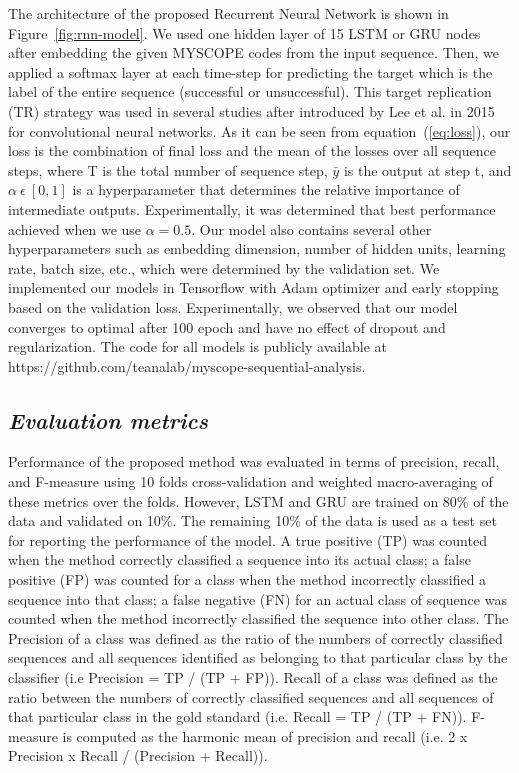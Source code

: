 \documentclass{amia_summit_2018}
\begin{document}
The architecture of the proposed Recurrent Neural Network is shown in Figure~\ref{fig:rnn-model}. We used one hidden layer of 15 LSTM or GRU nodes after embedding the given MYSCOPE codes from the input sequence. Then, we applied a softmax layer at each time-step for predicting the target which is the label of the entire sequence (successful or unsuccessful). This target replication (TR) strategy was used in several studies \cite{lipton2015learning, choi2016doctor} after introduced by Lee et al.\cite{lee2015deeply} in 2015 for convolutional neural networks. As it can be seen from equation~(\ref{eq:loss}), our loss is the combination of final loss and the mean of the losses over all sequence steps, where T is the total number of sequence step, $\bar y$ is the output at step t, and $\alpha\ \epsilon\ [0, 1]$ is a hyperparameter that determines the relative importance of intermediate outputs. Experimentally, it was determined that best performance achieved when we use  $\alpha=0.5$. Our model also contains several other hyperparameters such as embedding dimension, number of hidden units, learning rate, batch size, etc., which were determined by the validation set. We implemented our models in Tensorflow with Adam optimizer and early stopping based on the validation loss. Experimentally, we observed that our model converges to optimal after 100 epoch and have no effect of dropout and regularization. The code for all models is publicly available at https://github.com/teanalab/myscope-sequential-analysis.   
  
\subsection*{\textit{Evaluation metrics}}
Performance of the proposed method was evaluated in terms of precision, recall, and F-measure using 10 folds cross-validation and weighted macro-averaging of these metrics over the folds. However, LSTM and GRU are trained on 80\% of the data and validated on 10\%. The remaining 10\% of the data is used as a test set for reporting the performance of the model. A true positive (TP) was counted when the method correctly classified a sequence into its actual class; a false positive (FP) was counted for a class when the method incorrectly classified a sequence into that class; a false negative (FN) for an actual class of sequence was counted when the method incorrectly classified the sequence into other class. The Precision of a class was defined as the ratio of the numbers of correctly classified sequences and all sequences identified as belonging to that particular class by the classifier (i.e Precision = TP / (TP + FP)). Recall of a class was defined as the ratio between the numbers of correctly classified sequences and all sequences of that particular class in the gold standard (i.e. Recall = TP / (TP + FN)). F-measure is computed as the harmonic mean of precision and recall (i.e. 2 x Precision x Recall / (Precision + Recall)). 
\end{document}

